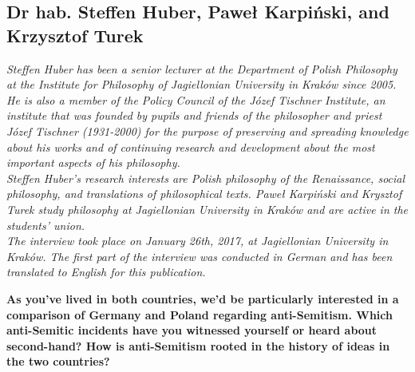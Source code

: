  \begin{flushleft}
 	\section{Dr hab. Steffen Huber, Paweł Karpiński, and Krzysztof Turek}
 \end{flushleft}

\textit{Steffen Huber has been a senior lecturer at the Department of Polish Philosophy at the Institute for Philosophy of Jagiellonian University in Kraków since 2005. He is also a member of the Policy Council of the Józef Tischner Institute, an institute that was founded by pupils and friends of the philosopher and priest Józef Tischner (1931-2000) for the purpose of preserving and spreading knowledge about his works and of continuing research and development about the most important aspects of his philosophy.\\ 
Steffen Huber’s research interests are Polish philosophy of the Renaissance, social philosophy, and translations of philosophical texts. 
Paweł Karpiński and Krysztof Turek study philosophy at Jagiellonian University in Kraków and are active in the students' union.\\ 
The interview took place on January 26th, 2017, at Jagiellonian University in Kraków. The first part of the interview was conducted in German and has been translated to English for this publication.}\par
\vspace*{2em}
\textbf{As you've lived in both countries, we'd be particularly interested in a comparison of Germany and Poland regarding anti-Semitism. Which anti-Semitic incidents have you witnessed yourself or heard about second-hand? How is anti-Semitism rooted in the history of ideas in the two countries?} 


